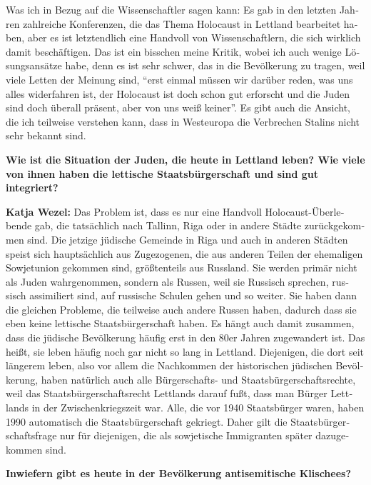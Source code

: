 \begin{otherlanguage}{ngerman}
Was ich in Bezug auf die Wissenschaftler sagen kann: Es gab in den letzten Jahren zahlreiche Konferenzen, die das Thema Holocaust in Lettland bearbeitet haben, aber es ist letztendlich eine Handvoll von Wissenschaftlern, die sich wirklich damit beschäftigen. Das ist ein bisschen meine Kritik, wobei ich auch wenige Lösungsansätze habe, denn es ist sehr schwer, das in die Bevölkerung zu tragen, weil viele Letten der Meinung sind, ``erst einmal müssen wir darüber reden, was uns alles widerfahren ist, der Holocaust ist doch schon gut erforscht und die Juden sind doch überall präsent, aber von uns weiß keiner''. Es gibt auch die Ansicht, die ich teilweise verstehen kann, dass in Westeuropa die Verbrechen Stalins nicht sehr bekannt sind. 

\textbf{Wie ist die Situation der Juden, die heute in Lettland leben? Wie viele von ihnen haben die lettische Staatsbürgerschaft und sind gut integriert?} 

\textbf{Katja Wezel:} Das Problem ist, dass es nur eine Handvoll Holocaust-Überlebende gab, die tatsächlich nach Tallinn, Riga oder in andere Städte zurückgekommen sind. Die jetzige jüdische Gemeinde in Riga und auch in anderen Städten speist sich hauptsächlich aus Zugezogenen, die aus anderen Teilen der ehemaligen Sowjetunion gekommen sind, größtenteils aus Russland. Sie werden primär nicht als Juden wahrgenommen, sondern als Russen, weil sie Russisch sprechen, russisch assimiliert sind, auf russische Schulen gehen und so weiter. Sie haben dann die gleichen Probleme, die teilweise auch andere Russen haben, dadurch dass sie eben keine lettische Staatsbürgerschaft haben. Es hängt auch damit zusammen, dass die jüdische Bevölkerung häufig erst in den 80er Jahren zugewandert ist. Das heißt, sie leben häufig noch gar nicht so lang in Lettland. Diejenigen, die dort seit längerem leben, also vor allem die Nachkommen der historischen jüdischen Bevölkerung, haben natürlich auch alle Bürgerschafts- und Staatsbürgerschaftsrechte, weil das Staatsbürgerschaftsrecht Lettlands darauf fußt, dass man Bürger Lettlands in der Zwischenkriegszeit war. Alle, die vor 1940 Staatsbürger waren, haben 1990 automatisch die Staatsbürgerschaft gekriegt. Daher gilt die Staatsbürgerschaftsfrage nur für diejenigen, die als sowjetische Immigranten später dazugekommen sind. 

\textbf{Inwiefern gibt es heute in der Bevölkerung antisemitische Klischees?} 


\end{otherlanguage}
